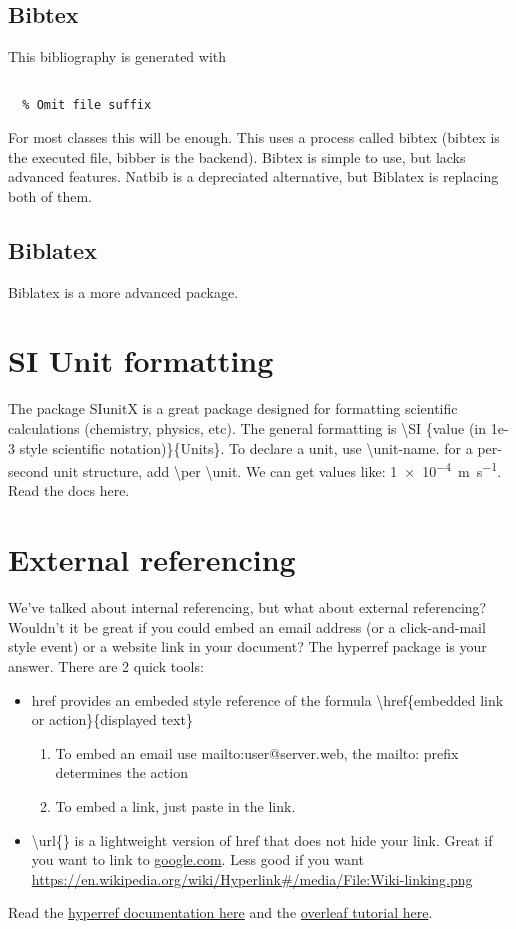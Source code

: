 \documentclass[11pt]{article}
\begin{document}
\subsection{Bibtex}
This bibliography is generated with
\begin{verbatim}

  % Omit file suffix
\end{verbatim}


For most classes this will be enough. This uses a process called bibtex (bibtex is the executed file, bibber is the backend). Bibtex is simple to use, but lacks advanced features. Natbib is a depreciated alternative, but Biblatex is replacing both of them.
\subsection{Biblatex}
Biblatex is a more advanced package.

\section{SI Unit formatting}
The package SIunitX is a great package designed for formatting scientific calculations (chemistry, physics, etc). The general formatting is
\textbackslash SI \{value (in 1e-3 style scientific notation)\}\{Units\}. To declare a unit, use \textbackslash unit-name. for a per-second unit structure, add \textbackslash per \textbackslash unit. We can get values like: \SI{1e-4}{\meter\per\second}. Read the docs here.

\section{External referencing}
We've talked about internal referencing, but what about external referencing? Wouldn't it be great if you could embed an email address (or a click-and-mail style event) or a website link in your document? The hyperref package is your answer. There are 2 quick tools:
\begin{itemize}
	\item href provides an embeded style reference of the formula \textbackslash href\{embedded link or action\}\{displayed text\}
	\begin{enumerate}
		\item To embed an email use mailto:user@server.web, the mailto: prefix determines the action
		\item To embed a link, just paste in the link.
	\end{enumerate}
\item \textbackslash url\{\} is a lightweight version of href that does not hide your link. Great if you want to link to \url{google.com}. Less good if you want \url{https://en.wikipedia.org/wiki/Hyperlink#/media/File:Wiki-linking.png}
\end{itemize}
Read the \href{http://mirror.utexas.edu/ctan/macros/latex/contrib/hyperref/doc/manual.pdf}{hyperref documentation here} and the \href{https://www.overleaf.com/learn/latex/hyperlinks}{overleaf tutorial here}.
\end{document}
